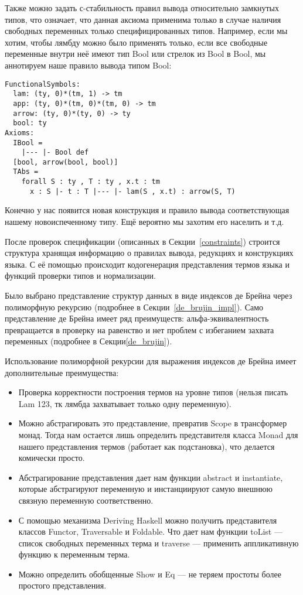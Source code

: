 Также можно задать с-стабильность правил вывода относительно замкнутых типов, что означает, что данная аксиома применима только в случае наличия свободных переменных только специфицированных типов. Например, если мы хотим, чтобы лямбду можно было применять только, если все свободные переменные внутри неё имеют тип Bool или стрелок из Bool в Bool, мы аннотируем наше правило вывода типом Bool:
\begin{lstlisting}[frame=single]
FunctionalSymbols:
  lam: (ty, 0)*(tm, 1) -> tm
  app: (ty, 0)*(tm, 0)*(tm, 0) -> tm
  arrow: (ty, 0)*(ty, 0) -> ty
  bool: ty
Axioms:
  IBool =
    |--- |- Bool def
  [bool, arrow(bool, bool)]
  TAbs =
    forall S : ty , T : ty , x.t : tm
      x : S |- t : T |--- |- lam(S , x.t) : arrow(S, T)
\end{lstlisting}

Конечно у нас появится новая конструкция и правило вывода соответствующая нашему новоиспеченному типу. Ещё вероятно мы захотим его населить и т.д.

\hfill

После проверок спецификации (описанных в Секции~\ref{constraints}) строится структура хранящая информацию о правилах вывода, редукциях и конструкциях языка. С её помощью происходит кодогенерация представления термов языка и функций проверки типов и нормализации.

Было выбрано представление структур данных в виде индексов де Брейна через полиморфную рекурсию (подробнее в Секции~\ref{de_brujin_impl}). Само представление де Брейна имеет ряд преимуществ: альфа-эквивалентность превращается в проверку на равенство и нет проблем с избеганием захвата переменных (подробнее в Секции\ref{de_brujin}).

Использование полиморфной рекурсии для выражения индексов де Брейна имеет дополнительные преимущества:
\begin{itemize}
  \item Проверка корректности построения термов на уровне типов (нельзя писать Lam 123, тк лямбда захватывает только одну переменную).
  \item Можно абстрагировать это представление, превратив Scope в трансформер монад. Тогда нам остается лишь определить представителя класса Monad для нашего представления термов (работает как подстановка), что делается комически просто.
  \item Абстрагирование представления дает нам функции abstract и instantiate, которые абстрагируют переменную и инстанциируют самую внешнюю связную переменную соответственно.
  \item С помощью механизма Deriving Haskell можно получить представителя классов Functor, Traversable и Foldable. Что дает нам функции toList --- список свободных переменных терма и traverse --- применить аппликативную функцию к переменным терма.
  \item Можно определить обобщенные Show и Eq --- не теряем простоты более простого представления.
\end{itemize}

